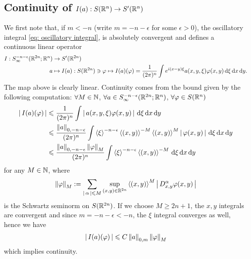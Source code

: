 \documentclass{article}
\begin{document}
\subsection{Continuity of $I(a) : S(\R^n) \to S'(\R^n)$}
We first note that, if $m < -n$ (write $m = -n - \epsilon$ for some $\epsilon > 0$), the oscillatory integral \ref{eq: oscillatory integral}, is absolutely convergent and defines a continuous linear operator 
\begin{align*}
I: S^{-n -\epsilon}_\infty(\R^{2n}; \R^n) &\to S'(\R^{2n}) \\
 a & \mapsto I(a) : S(\R^{2n}) \ni \varphi \mapsto I(a)(\varphi) = \frac{1}{(2\pi)^n} \int e^{i(x- y)\xi} a(x, y, \xi) \varphi(x, y) \d[\xi] \d[x] \d[y]. 
\end{align*} 
The map above is clearly linear. Continuity comes from the bound given by the following computation: $\forall M \in \N$, $\forall a \in S^{-n -\epsilon}_\infty(\R^{2n}; \R^n)$, $\forall \varphi \in S(\R^n)$ 
\begin{align*}
\abs{I(a)(\varphi)}
& \leq \frac{1}{(2\pi)^n} \int \abs{a(x, y, \xi) \varphi(x, y)} \d[\xi] \d[x] \d[y]\\
& \leq \frac{\norm[a]_{0, -n -\epsilon}}{(2\pi)^n} \int \sym[\xi]^{-n -\epsilon} \sym[(x, y)]^{-M} \sym[(x, y)]^{M} \abs{\varphi(x, y)} \d[\xi] \d[x] \d[y]\\
& \leq \frac{\norm[a]_{0, -n -\epsilon} \norm[\varphi]_M}{(2\pi)^n} \int \sym[\xi]^{-n -\epsilon} \sym[(x, y)]^{-M}  \d[\xi] \d[x] \d[y]\\
\end{align*}
for any $M \in \N$, where 
\begin{align} \label{eq: Schwartz seminorm} 
\norm[\varphi]_M :=  \sum_{\abs{\alpha} \leq M}  \sup_{(x, y) \in \R^{2n}} \sym[(x, y)]^M \abs{D^{\alpha}_{x, y} \varphi(x, y)}
\end{align}
is the Schwartz  seminorm on $S(\R^{2n})$. If we choose $M \geq 2n +1$, the $x, y$ integrals are convergent and since $m = -n -\epsilon < -n$, the $\xi$ integral converges as well, hence we have 
\begin{align*}
\abs{I(a)(\varphi)} \leq C \norm[a]_{0, m} \norm[\varphi]_M
\end{align*}
which implies continuity. \\
\end{document}

